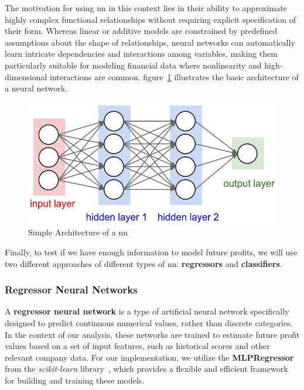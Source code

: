 \documentclass[11pt,english,a4paper,hidelinks]{book}
\begin{document}
\vspace{0.5cm}
\noindent The motivation for using \acrshort{nn} in this context lies in their ability to approximate highly complex functional relationships without requiring explicit specification of their form. Whereas linear or additive models are constrained by predefined assumptions about the shape of relationships, neural networks can automatically learn intricate dependencies and interactions among variables, making them particularly suitable for modeling financial data where nonlinearity and high-dimensional interactions are common. figure~\ref{fig:nn-basic-schema} illustrates the basic architecture of a neural network.

\vspace{0.5cm}
\begin{figure}[H]
    \centering
    \includegraphics[width=1\textwidth]{images/code/neural_network/basic_schema.png}
    \caption{Simple Architecture of a \acrshort{nn}}
    \label{fig:nn-basic-schema}
\end{figure}

\noindent Finally, to test if we have enough information to model future profits, we will use two different approaches of different types of \acrshort{nn}: \textbf{regressors} and \textbf{classifiers}.

\subsubsection{Regressor Neural Networks}

\noindent
A \textbf{regressor neural network} is a type of artificial neural network specifically designed to predict continuous numerical values, rather than discrete categories. In the context of our analysis, these networks are trained to estimate future profit values based on a set of input features, such as historical scores and other relevant company data. For our implementation, we utilize the \textbf{MLPRegressor} from the \textit{scikit-learn} library~\cite{scikit2025mlpregressor}, which provides a flexible and efficient framework for building and training these models.
\end{document}
